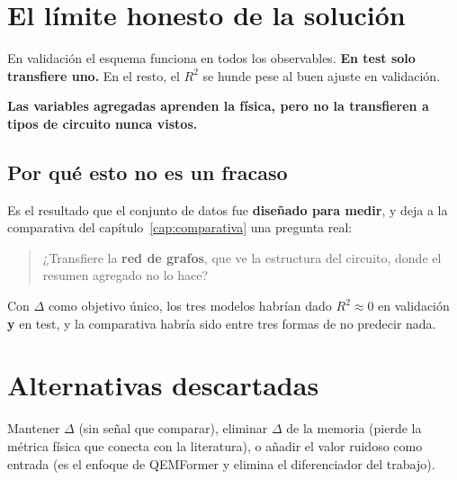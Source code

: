 \section{El límite honesto de la solución}
\label{sec:limite}
En validación el esquema funciona en todos los observables. \textbf{En test solo transfiere
uno.} En el resto, el $R^2$ se hunde pese al buen ajuste en validación.

\textbf{Las variables agregadas aprenden la física, pero no la transfieren a tipos de circuito
nunca vistos.}

\subsection{Por qué esto no es un fracaso}
Es el resultado que el conjunto de datos fue \textbf{diseñado para medir}, y deja a la
comparativa del capítulo~\ref{cap:comparativa} una pregunta real:

\begin{quote}
¿Transfiere la \textbf{red de grafos}, que ve la estructura del circuito, donde el
resumen agregado no lo hace?
\end{quote}

Con $\Delta$ como objetivo único, los tres modelos habrían dado $R^2 \approx 0$ en validación
\textbf{y} en test, y la comparativa habría sido entre tres formas de no predecir nada.

\section{Alternativas descartadas}
\label{sec:alternativas_objetivo}
Mantener $\Delta$ (sin señal que comparar), eliminar $\Delta$ de la memoria (pierde la métrica
física que conecta con la literatura), o añadir el valor ruidoso como entrada (es el enfoque
de QEMFormer y elimina el diferenciador del trabajo).
